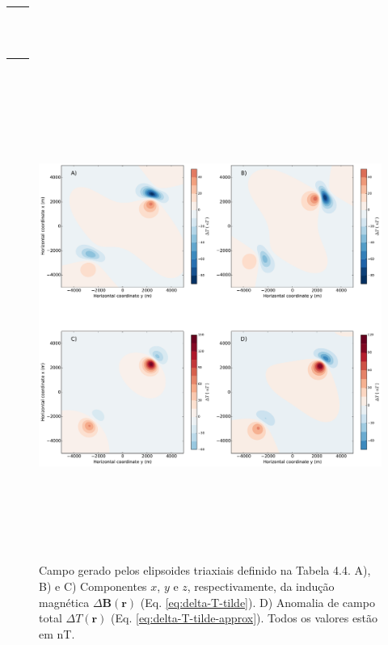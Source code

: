 \begin{table}[h!]
	\begin{center}
		\begin{tabular}{lc}
			
			&  \\
			& \\
			&  \\
			& \\
			&  \\
			& \\
			&  \\
			& \\
			&  \\
			& \\
			&  \\
			& \\
		\end{tabular}
	\end{center}
\end{table}

\begin{figure}[hbt!]
	\centering \includegraphics[width=16cm,height=16cm]{figures/ellipsoid_triaxial_multi}
	\caption[Campo gerado pelos elipsoides triaxiais definido na Tabela 4.4. A), B) e C) Componentes $x$, $y$ e $z$, respectivamente, da indução magnética $\Delta \mathbf{B}(\mathbf{r})$ (Eq. \ref{eq:delta-T-tilde}). D) Anomalia de campo total $\Delta T (\mathbf{r})$ (Eq. \ref{eq:delta-T-tilde-approx}). Todos os valores estão em nT.]{Campo gerado pelos elipsoides triaxiais definido na Tabela 4.4. A), B) e C) Componentes $x$, $y$ e $z$, respectivamente, da indução magnética $\Delta \mathbf{B}(\mathbf{r})$ (Eq. \ref{eq:delta-T-tilde}). D) Anomalia de campo total $\Delta T (\mathbf{r})$ (Eq. \ref{eq:delta-T-tilde-approx}). Todos os valores estão em nT.}
	\label{fig:ellipsoid_triaxial_multi}
\end{figure}


